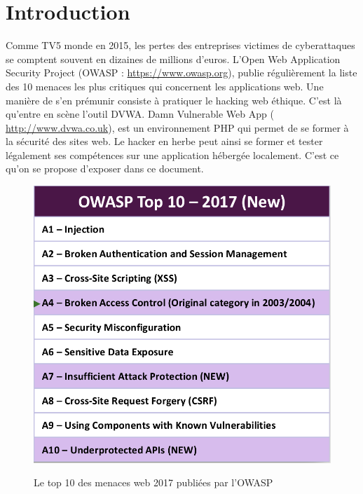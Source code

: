 
\pagebreak

\section*{Introduction}
Comme TV5 monde en 2015, les pertes des entreprises victimes de cyberattaques se comptent souvent en dizaines de millions d'euros. L'Open Web Application Security Project (OWASP : {\color{blue} \url{https://www.owasp.org}}), publie régulièrement la liste des 10 menaces les plus critiques qui concernent les applications web. Une manière de s'en prémunir consiste à pratiquer le hacking web éthique. C'est là qu'entre en scène l'outil DVWA. Damn Vulnerable Web App ({\color{blue} \url{http://www.dvwa.co.uk}}), est un environnement PHP qui permet de se former à la sécurité des sites web. Le hacker en herbe peut ainsi se former et tester légalement ses compétences sur une application hébergée localement. C'est ce qu'on se propose d'exposer dans ce document.  

\begin{figure}[!h]
	\begin{center}
		\label{10_menaces}
		\includegraphics[scale=0.4]{images/10_menaces.png}
		\caption{Le top 10 des menaces web 2017 publiées par l'OWASP}
	\end{center}
\end{figure}

